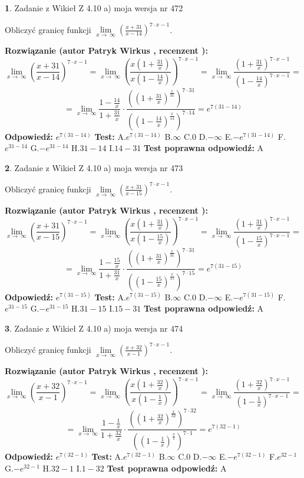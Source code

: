 \documentclass[12pt, a4paper]{article}
\theoremstyle{definition} %
\newtheorem{zad}{}
\newcommand{\zadStart}[1]{\begin{zad}#1\newline}
\newcommand{\zadStop}{\end{zad}}
\newcommand{\rozwStart}[2]{\noindent \textbf{Rozwiązanie (autor #1 , recenzent #2): }\newline}
\newcommand{\rozwStop}{\newline}
\newcommand{\odpStart}{\noindent \textbf{Odpowiedź:}\newline}
\newcommand{\odpStop}{\newline}
\newcommand{\testStart}{\noindent \textbf{Test:}\newline}
\newcommand{\testStop}{\newline}
\newcommand{\kluczStart}{\noindent \textbf{Test poprawna odpowiedź:}\newline}
\newcommand{\kluczStop}{\newline}
\begin{document}
\zadStart{Zadanie z Wikieł Z 4.10 a) moja wersja nr 472}


Obliczyć granicę funkcji  $\lim\limits_{x\to\ \infty}(\frac{x+31}{x-14})^{7\cdot x-1}$.
\zadStop
\rozwStart{Patryk Wirkus}{}
$$\lim\limits_{x\to\ \infty}(\frac{x+31}{x-14})^{7\cdot x-1} = \lim\limits_{x\to\ \infty}(\frac{x(1+\frac{31}{x})}{x(1-\frac{14}{x})})^{7\cdot x-1}=\lim\limits_{x\to\ \infty}\frac{(1+\frac{31}{x})^{7\cdot x-1}}{(1-\frac{14}{x})^{7\cdot x-1}}=$$
$$=\lim\limits_{x\to\ \infty}\frac{1-\frac{14}{x}}{1+\frac{31}{x}}\cdot\frac{((1+\frac{31}{x})^{\frac{x}{31}})^{7\cdot31}}{((1-\frac{14}{x})^{\frac{x}{14}})^{7\cdot14}}=e^{7(31-14)}$$
\rozwStop
\odpStart
$e^{7(31-14)}$
\odpStop
\testStart
A.$e^{7(31-14)}$ B.$\infty$ C.$0$ D.$-\infty$ E.$-e^{7(31-14)}$
F.$e^{31-14}$ G.$-e^{31-14}$
H.$31-14$
I.$14-31$
\testStop
\kluczStart
A
\kluczStop



\zadStart{Zadanie z Wikieł Z 4.10 a) moja wersja nr 473}


Obliczyć granicę funkcji  $\lim\limits_{x\to\ \infty}(\frac{x+31}{x-15})^{7\cdot x-1}$.
\zadStop
\rozwStart{Patryk Wirkus}{}
$$\lim\limits_{x\to\ \infty}(\frac{x+31}{x-15})^{7\cdot x-1} = \lim\limits_{x\to\ \infty}(\frac{x(1+\frac{31}{x})}{x(1-\frac{15}{x})})^{7\cdot x-1}=\lim\limits_{x\to\ \infty}\frac{(1+\frac{31}{x})^{7\cdot x-1}}{(1-\frac{15}{x})^{7\cdot x-1}}=$$
$$=\lim\limits_{x\to\ \infty}\frac{1-\frac{15}{x}}{1+\frac{31}{x}}\cdot\frac{((1+\frac{31}{x})^{\frac{x}{31}})^{7\cdot31}}{((1-\frac{15}{x})^{\frac{x}{15}})^{7\cdot15}}=e^{7(31-15)}$$
\rozwStop
\odpStart
$e^{7(31-15)}$
\odpStop
\testStart
A.$e^{7(31-15)}$ B.$\infty$ C.$0$ D.$-\infty$ E.$-e^{7(31-15)}$
F.$e^{31-15}$ G.$-e^{31-15}$
H.$31-15$
I.$15-31$
\testStop
\kluczStart
A
\kluczStop



\zadStart{Zadanie z Wikieł Z 4.10 a) moja wersja nr 474}


Obliczyć granicę funkcji  $\lim\limits_{x\to\ \infty}(\frac{x+32}{x-1})^{7\cdot x-1}$.
\zadStop
\rozwStart{Patryk Wirkus}{}
$$\lim\limits_{x\to\ \infty}(\frac{x+32}{x-1})^{7\cdot x-1} = \lim\limits_{x\to\ \infty}(\frac{x(1+\frac{32}{x})}{x(1-\frac{1}{x})})^{7\cdot x-1}=\lim\limits_{x\to\ \infty}\frac{(1+\frac{32}{x})^{7\cdot x-1}}{(1-\frac{1}{x})^{7\cdot x-1}}=$$
$$=\lim\limits_{x\to\ \infty}\frac{1-\frac{1}{x}}{1+\frac{32}{x}}\cdot\frac{((1+\frac{32}{x})^{\frac{x}{32}})^{7\cdot32}}{((1-\frac{1}{x})^{\frac{x}{1}})^{7\cdot1}}=e^{7(32-1)}$$
\rozwStop
\odpStart
$e^{7(32-1)}$
\odpStop
\testStart
A.$e^{7(32-1)}$ B.$\infty$ C.$0$ D.$-\infty$ E.$-e^{7(32-1)}$
F.$e^{32-1}$ G.$-e^{32-1}$
H.$32-1$
I.$1-32$
\testStop
\kluczStart
A
\kluczStop
\end{document}
